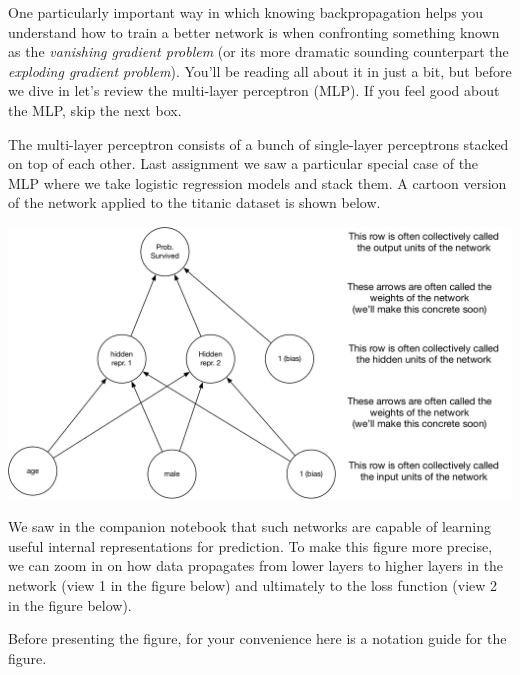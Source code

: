 \documentclass[assignment07_Solutions]{subfiles}
\begin{document}
One particularly important way in which knowing backpropagation helps you understand how to train a better network is when confronting something known as the \emph{vanishing gradient problem} (or its more dramatic sounding counterpart the \emph{exploding gradient problem}).  You'll be reading all about it in just a bit, but before we dive in let's review the multi-layer perceptron (MLP).  If you feel good about the MLP, skip the next box.

\begin{recall}
The multi-layer perceptron consists of a bunch of single-layer perceptrons stacked on top of each other.  Last assignment we saw a particular special case of the MLP where we take logistic regression models and stack them.  A cartoon version of the network applied to the titanic dataset is shown below.

\begin{center}
\includegraphics[width=0.7\linewidth]{figures/titanicmlpsimple}
\end{center}

We saw in the companion notebook that such networks are capable of learning useful internal representations for prediction.  To make this figure more precise, we can zoom in on how data propagates from lower layers to higher layers in the network (view 1 in the figure below) and ultimately to the loss function (view 2 in the figure below).

\vspace{1em}

Before presenting the figure, for your convenience here is a notation guide for the figure.
\vspace{1em}


\end{recall}
\end{document}
